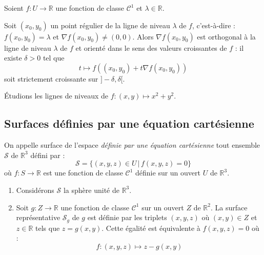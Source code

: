 \documentclass[french,11pt,twoside]{VcCours}
\begin{document}
\begin{Proposition}{} Soient $f : U \rightarrow \mathbb{R}$ une fonction de classe $\mathcal{C}^1$ et $\lambda \in \mathbb{R}$.

Soit $(x_0,y_0)$ un point régulier de la ligne de niveau $\lambda$ de $f$, c'est-à-dire : $f(x_0,y_0)=\lambda$ et $\nabla f (x_0,y_0) \neq (0,0)$. Alors $\nabla  f (x_0,y_0)$ est orthogonal  à la ligne de niveau $\lambda$ de $f$ et orienté dans le sens des valeurs croissantes de $f$ : il existe $\delta >0$ tel que 
$$ t \mapsto f((x_0,y_0) + t \nabla  f (x_0,y_0))$$
soit strictement croissante sur $]-\delta, \delta[$.
\end{Proposition}

\begin{Exemple}{} Étudions les lignes de niveaux de $f : (x,y) \mapsto x^2+y^2$.

\vspace*{6cm}
\end{Exemple}



\subsection{Surfaces définies par une équation cartésienne}
\medskip

On appelle surface de l'espace \emph{définie par une équation cartésienne} tout ensemble $\mathcal{S}$ de $\mathbb{R}^3$ défini par :
$$ \mathcal{S} = \lbrace (x,y,z) \in U \, \vert \, f(x,y,z)=0 \rbrace$$
où $f : S \rightarrow \mathbb{R}$ est une fonction de classe $\mathcal{C}^1$ définie sur un ouvert $U$ de $\mathbb{R}^3$.

\medskip

\begin{Exemples}{}
\begin{enumerate}
\item Considérons $\mathcal{S}$ la sphère unité de $\mathbb{R}^3$.

\vspace*{5cm}
\item Soit $g : Z \rightarrow \mathbb{R}$ une fonction de classe $\mathcal{C}^1$ sur un ouvert $Z$ de $\mathbb{R}^2$. La surface représentative $\mathcal{S}_g$ de $g$ est définie par les triplets $(x,y,z)$ où $(x,y) \in Z$ et $z \in \mathbb{R}$ tels que $z=g(x,y)$. Cette égalité est équivalente à $f(x,y,z) =0$ où :
$$ f : (x,y,z) \mapsto z-g(x,y) $$
\end{enumerate}
\end{Exemples}
\end{document}
